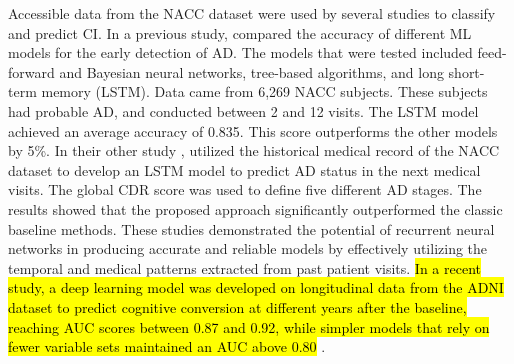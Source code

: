 Accessible data from the NACC dataset were used by several studies to classify and predict CI. In a previous study,  compared the accuracy of different ML models for the early detection of AD. The models that were tested included feed-forward and Bayesian neural networks, tree-based algorithms, and long short-term memory (\acrshort{LSTM}). Data came from 6,269 NACC subjects. These subjects had probable AD, and conducted between 2 and 12 visits. The LSTM model achieved an average accuracy of 0.835. This score outperforms the other models by 5\%. In their other study \cite{Wang2018Predictive}, \citeauthor{Wang2018Predictive} utilized the historical medical record of the NACC dataset to develop an LSTM model to predict AD status in the next medical visits. The global CDR score was used to define five different AD stages. The results showed that the proposed approach significantly outperformed the classic baseline methods. These studies demonstrated the potential of recurrent neural networks in producing accurate and reliable models by effectively utilizing the temporal and medical patterns extracted from past patient visits. \hl{In a recent study, a deep learning model was developed on longitudinal data from the ADNI dataset to predict cognitive conversion at different years after the baseline, reaching AUC scores between 0.87 and 0.92, while simpler models that rely on fewer variable sets maintained an AUC above 0.80} \cite{Yang2025Prediction}.

